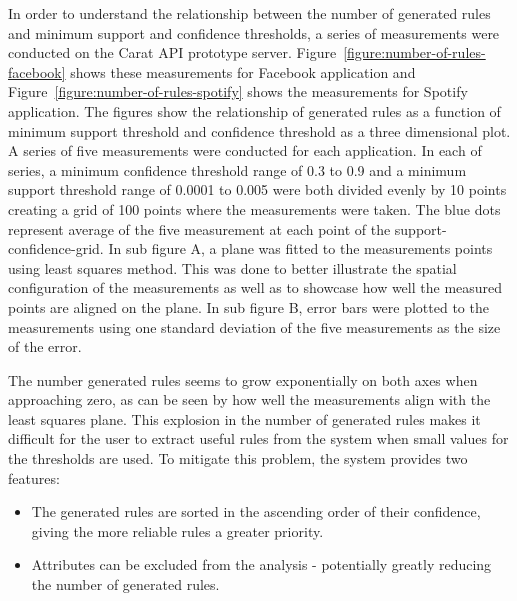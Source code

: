 In order to understand the relationship between the number of generated rules and minimum support and confidence thresholds, a series of measurements were conducted on the Carat API prototype server. Figure~\ref{figure:number-of-rules-facebook} shows these  measurements for Facebook application and Figure~\ref{figure:number-of-rules-spotify} shows the measurements for Spotify application. The figures show the relationship of generated rules as a function of minimum support threshold and confidence threshold as a three dimensional plot. A series of five measurements were conducted for each application. In each of series, a minimum confidence threshold range of 0.3 to 0.9 and a minimum support threshold range of 0.0001 to 0.005 were both divided evenly by 10 points creating a grid of 100 points where the measurements were taken. The blue dots represent average of the five measurement at each point of the support-confidence-grid. In sub figure A, a plane was fitted to the measurements points using least squares method. This was done to better illustrate the spatial configuration of the measurements as well as to showcase how well the measured points are aligned on the plane. In sub figure B, error bars were plotted to the measurements using one standard deviation of the five measurements as the size of the error. 


The number generated rules seems to grow exponentially on both axes when approaching zero, as can be seen by how well the measurements align with the least squares plane. This explosion in the number of generated rules makes it difficult for the user to extract useful rules from the system when small values for the thresholds are used. To mitigate this problem, the system provides two features:

\begin{itemize}
	\item The generated rules are sorted in the ascending order of their confidence, giving the more reliable rules a greater priority.    
         
	\item Attributes can be excluded from the analysis - potentially greatly reducing the number of generated rules. 
\end{itemize}        

